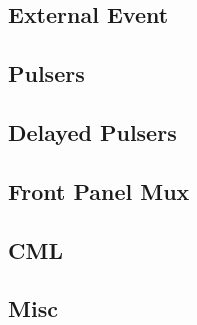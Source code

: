 \documentclass[a4paper,10pt]{article}
\begin{document}
	\subsection{External Event}
	\subsection{Pulsers}
	\subsection{Delayed Pulsers}
	\subsection{Front Panel Mux}
	\subsection{CML}
	\subsection{Misc}
\end{document}
